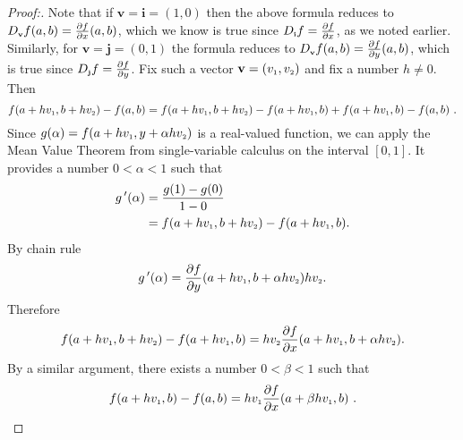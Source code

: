 \begin{proofbar}
\begin{proof}[Proof:]
 Note that if $\mathbf{v} = \mathbf{i} = (1,0)$ then the above formula reduces to
 $D_{\scriptscriptstyle \mathbf{v}}f(a,b) = \tfrac{\partial f}{\partial x}(a,b)$, which we know is true since
 $D_{\scriptscriptstyle \mathbf{i}}f = \tfrac{\partial f}{\partial x}$, as we noted earlier. Similarly, for
 $\mathbf{v} = \mathbf{j} = (0,1)$ the formula reduces to $D_{\scriptscriptstyle \mathbf{v}}f(a,b) =
 \tfrac{\partial f}{\partial y}(a,b)$, which is true since $D_{\scriptscriptstyle \mathbf{j}}f = \tfrac{\partial f}{\partial y}$.
 Fix such a vector $\mathbf{v} = (v_{\scriptscriptstyle 1},v_{\scriptscriptstyle 2})$ and fix a number $h \ne 0$.
Then
 \begin{equation}\label{eqn:dirderivdiff}
  f(a+hv_{\scriptscriptstyle 1},b+hv_{\scriptscriptstyle 2}) - f(a,b) = f(a+hv_{\scriptscriptstyle 1},b+hv_{\scriptscriptstyle 2}) - f(a+hv_{\scriptscriptstyle 1},b) +
   f(a+hv_{\scriptscriptstyle 1},b) - f(a,b) ~.
 \end{equation}
 Since $g(\alpha)=f(a+hv_{\scriptscriptstyle 1},y+\alpha hv_{\scriptscriptstyle 2})$ is a real-valued function,
 we can apply
 the Mean Value Theorem from single-variable calculus on the interval $[0,1]$.
 It provides a number $0 < \alpha < 1$ such that
 \begin{align*}
  g\,'(\alpha) 
  &= 
   \frac{g(1) - g(0)}{1-0} 
   \\
   &=
   f(a+hv_{\scriptscriptstyle 1},b+hv_{\scriptscriptstyle 2}) - f(a+hv_{\scriptscriptstyle 1},b).
 \end{align*}
 By chain rule
 \[g\,'(\alpha)=\frac{\partial f}{\partial y}(a+hv_{\scriptscriptstyle 1},b+\alpha hv_{\scriptscriptstyle 2}) hv_{\scriptscriptstyle 2}.\]
 Therefore 
 \[f(a+hv_{\scriptscriptstyle 1},b+hv_{\scriptscriptstyle 2}) - f(a+hv_{\scriptscriptstyle 1},b)
 =
 hv_{\scriptscriptstyle 2}\frac{\partial f}{\partial x}(a+hv_{\scriptscriptstyle 1},b+\alpha hv_{\scriptscriptstyle 2}) .\]
 By a similar argument, there exists a number $0 < \beta < 1$ such that
 \begin{displaymath}
  f(a+hv_{\scriptscriptstyle 1},b) - f(a,b) = hv_{\scriptscriptstyle 1} \frac{\partial f}{\partial x}(a+\beta hv_{\scriptscriptstyle 1},b) ~.
 \end{displaymath}

\end{proof}
\end{proofbar}

